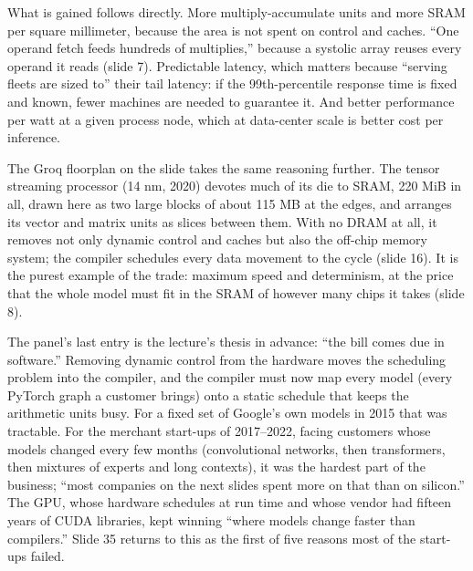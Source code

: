 \documentclass[11pt,letterpaper]{article}
\begin{document}
What is gained follows directly. More multiply-accumulate units and more SRAM per square millimeter, because the area is not spent on control and caches. ``One operand fetch feeds hundreds of multiplies,'' because a systolic array reuses every operand it reads (slide 7). Predictable latency, which matters because ``serving fleets are sized to'' their tail latency: if the 99th-percentile response time is fixed and known, fewer machines are needed to guarantee it. And better performance per watt at a given process node, which at data-center scale is better cost per inference.

The Groq floorplan on the slide takes the same reasoning further. The tensor streaming processor (14 nm, 2020) devotes much of its die to SRAM, 220 MiB in all, drawn here as two large blocks of about 115 MB at the edges, and arranges its vector and matrix units as slices between them. With no DRAM at all, it removes not only dynamic control and caches but also the off-chip memory system; the compiler schedules every data movement to the cycle (slide 16). It is the purest example of the trade: maximum speed and determinism, at the price that the whole model must fit in the SRAM of however many chips it takes (slide 8).

The panel's last entry is the lecture's thesis in advance: ``the bill comes due in software.'' Removing dynamic control from the hardware moves the scheduling problem into the compiler, and the compiler must now map every model (every PyTorch graph a customer brings) onto a static schedule that keeps the arithmetic units busy. For a fixed set of Google's own models in 2015 that was tractable. For the merchant start-ups of 2017--2022, facing customers whose models changed every few months (convolutional networks, then transformers, then mixtures of experts and long contexts), it was the hardest part of the business; ``most companies on the next slides spent more on that than on silicon.'' The GPU, whose hardware schedules at run time and whose vendor had fifteen years of CUDA libraries, kept winning ``where models change faster than compilers.'' Slide 35 returns to this as the first of five reasons most of the start-ups failed.
\end{document}
